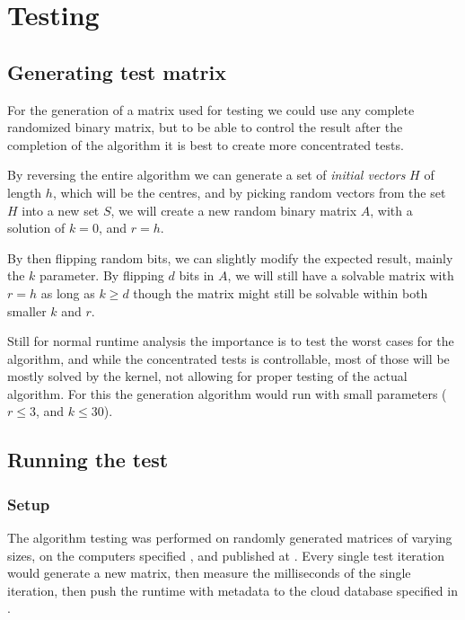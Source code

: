 \documentclass[a4paper]{article}
\begin{document}
%
%
\newpage

\section{Testing}
\label{sec:testing}
\subsection{Generating test matrix}
For the generation of a matrix used for testing we could use any complete randomized binary
matrix, but to be able to control the result after the completion of the algorithm it is best
to create more concentrated tests.

By reversing the entire algorithm we can generate a set of \textit{initial vectors} $H$ of length $h$, 
which will be the centres, and by picking random vectors from the set $H$ into a new set $S$,
we will create a new random binary matrix $A$, with a solution of $k=0$, and $r=h$. 

By then flipping random bits, we can slightly modify the expected result, mainly
the $k$ parameter. By flipping $d$ bits in $A$, we will still have a solvable matrix
with $r = h$ as long as $k \geq d$ though the matrix might still be solvable within both
smaller $k$ and $r$.



Still for normal runtime analysis the importance is to test the worst cases for the algorithm,
and while the concentrated tests is controllable, most of those will be mostly solved by the
kernel, not allowing for proper testing of the actual algorithm. For this the generation
algorithm would run with small parameters ($r \leq 3$, and $k \leq 30$).

\subsection{Running the test}
\subsubsection{Setup}
The algorithm testing was performed on randomly generated matrices of varying sizes, on the computers
specified , and published at \cite{datastudio_results}.
Every single test iteration would generate a new matrix, then measure the
milliseconds of the single iteration, then push the runtime with metadata to the cloud database specified
in .
\end{document}
